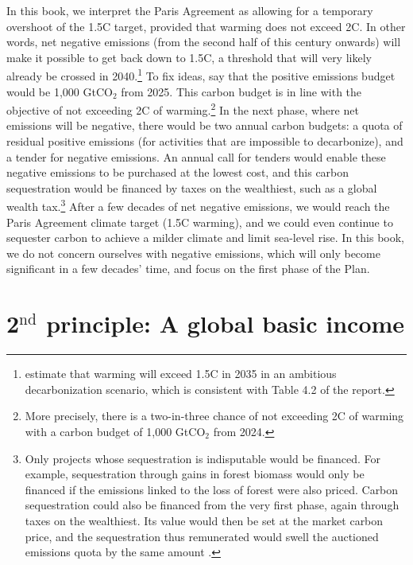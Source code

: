 \documentclass[a5paper,english,openany]{memoir}
\begin{document}
In this book, we interpret the Paris Agreement as allowing for a temporary overshoot of the 1.5\textdegree{}C target, provided that warming does not exceed 2\textdegree{}C. In other words, net negative emissions (from the second half of this century onwards) will make it possible to get back down to 1.5\textdegree{}C, a threshold that will very likely already be crossed in 2040.\footnote{\citet{diffenbaugh_data-driven_2023} estimate that warming will exceed 1.5\textdegree{}C in 2035 in an ambitious decarbonization scenario, which is consistent with Table 4.2 of the \citet{ipcc_climate_2021} report.} 
To fix ideas, say that the positive emissions budget would be 1,000 GtCO$_\text{2}$ from 2025. This carbon budget is in line with the objective of not exceeding 2\textdegree{}C of warming.\footnote{More precisely, there is a two-in-three chance of not exceeding 2\textdegree{}C of warming with a carbon budget of 1,000 GtCO$_\text{2}$ from 2024.} %
In the next phase, where net emissions will be negative, there would be two annual carbon budgets: a quota of residual positive emissions (for activities that are impossible to decarbonize), and a tender for negative emissions. An annual call for tenders would enable these negative emissions to be purchased at the lowest cost, and this carbon sequestration would be financed by taxes on the wealthiest, such as a global wealth tax.\footnote{Only projects whose sequestration is indisputable would be financed. For example, sequestration through gains in forest biomass would only be financed if the emissions linked to the loss of forest were also priced. Carbon sequestration could also be financed from the very first phase, again through taxes on the wealthiest. Its value would then be set at the market carbon price, and the sequestration thus remunerated would swell the auctioned emissions quota by the same amount \citep{edenhofer_governance_2023}.} %
After a few decades of net negative emissions, we would reach the Paris Agreement climate target (1.5\textdegree{}C warming), and we could even continue to sequester carbon to achieve a milder climate and limit sea-level rise. In this book, we do not concern ourselves with negative emissions, which will only become significant in a few decades' time, and focus on the first phase of the Plan. 

\section{2$^\text{nd}$ principle: A global basic income}\label{pcp:rdb}
\end{document}
